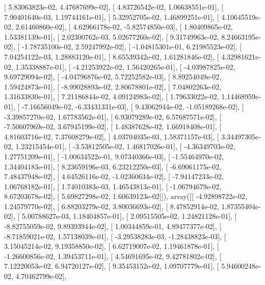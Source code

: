\documentclass{article}
\begin{document}
       [  5.83063823e-02,   4.47687699e-02],
       [  4.83726542e-02,   1.06638551e-01],
       [  7.90401640e-03,   1.19744161e-01],
       [  5.32952705e-02,   1.46899251e-01],
       [  4.10645519e-02,   2.61460860e-02],
       [  4.62966178e-02,  -5.82574850e-03],
       [  1.80409865e-02,   1.53381139e-01],
       [  2.02300762e-03,   5.02677260e-02],
       [  9.31749963e-02,   8.24663195e-02],
       [ -1.78735100e-02,   2.59247992e-02],
       [ -1.04815301e-01,   6.21985523e-02],
       [  7.04254122e-03,   1.28883120e-01],
       [  8.65539342e-02,   1.61281846e-02],
       [  4.32981621e-02,   1.35338887e-01],
       [ -4.21253922e-02,   1.56420265e-01],
       [ -4.03987825e-02,   9.69729094e-02],
       [ -4.04796876e-02,   5.72252582e-03],
       [  8.89254049e-02,   1.59424873e-01],
       [ -8.99028893e-02,   2.80678801e-02],
       [  7.04802263e-02,   1.31633830e-01],
       [  7.21186844e-02,   4.09124983e-02],
       [  1.79633022e-02,   1.14468959e-01],
       [ -7.16656049e-02,  -6.33431331e-03],
       [  9.43062944e-02,  -1.05189268e-02],
       [ -3.39857270e-02,   1.67783562e-01],
       [  6.93079289e-02,   6.57687571e-02],
       [ -7.50607969e-02,   3.67945199e-02],
       [  1.48387628e-02,   1.66918408e-01],
       [  4.81603716e-02,   7.37608279e-02],
       [  4.03704035e-03,   1.58371157e-03],
       [  3.34497305e-02,   1.23215454e-01],
       [ -3.53812505e-02,   1.46817026e-01],
       [ -4.36349703e-02,   1.27751209e-01],
       [ -1.00634522e-01,   9.07340366e-03],
       [ -1.55464970e-02,   1.34404183e-01],
       [  8.23659196e-03,   6.23212250e-03],
       [ -6.69061175e-02,   7.48437948e-02],
       [  4.64526116e-02,  -1.02360634e-02],
       [ -7.94147233e-02,   1.06768182e-01],
       [  1.74010383e-03,   1.46543813e-01],
       [ -1.06794679e-02,   8.67203678e-02],
       [  5.69827298e-02,   1.60639123e-02]]), array([[ -4.92898722e-02,   1.24579770e-02],
       [  6.88203279e-02,   3.80036693e-02],
       [  8.47852914e-02,   1.87355404e-02],
       [  5.00788627e-03,   1.18404857e-01],
       [  2.09515505e-02,   1.24821128e-01],
       [ -8.82755059e-02,   9.89393944e-02],
       [  1.00344859e-01,   4.89477377e-02],
       [ -8.71859021e-02,   1.57138039e-01],
       [ -3.29538283e-03,  -1.28438823e-03],
       [  3.15045214e-02,   9.19358850e-02],
       [  6.62719007e-02,   1.19461878e-01],
       [ -1.26600856e-02,   1.39453711e-01],
       [  4.54691695e-02,   9.42781802e-02],
       [  7.12220053e-02,   6.94720127e-02],
       [  9.35453152e-02,   1.09707779e-01],
       [  5.94600248e-02,   4.70462799e-02],
\end{document}
